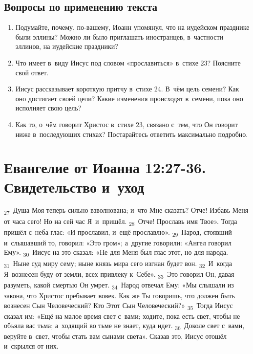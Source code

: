 \documentclass[a4paper,12pt]{article}
\begin{document}
\subsection*{Вопросы по применению текста} 
\begin{enumerate}
    \item Подумайте, почему, по-вашему, Иоанн упомянул, что на иудейском празднике были эллины? Можно ли было приглашать иностранцев, в~частности эллинов, на иудейские праздники?
    
    \myline
    
    \myline
    \item Что имеет в~виду Иисус под словом «прославиться» в~стихе 23? Поясните свой ответ. 
    
    \myline
    
    \myline
    \item Иисус рассказывает короткую притчу в~стихе 24. В~чём цель семени? Как оно достигает своей цели? Какие изменения происходят в~семени, пока оно исполняет свою цель? 
    
    \myline
    
    \myline
    \item Как то, о~чём говорит Христос в~стихе 23, связано с~тем, что Он говорит ниже в~последующих стихах? Постарайтесь ответить максимально подробно. 
    
    \myline
    
    \myline
\end{enumerate}



\section{Евангелие от Иоанна 12:27-36. Свидетельство и~уход}

\textsubscript{27}~Душа Моя теперь сильно взволнована; и~что Мне сказать? Отче! Избавь Меня от часа сего! Но на сей час Я~и~пришёл. \textsubscript{28}~Отче! Прославь имя Твое». Тогда пришёл с~неба глас: «И прославил, и~ещё прославлю». \textsubscript{29}~Народ, стоявший и~слышавший то, говорил: «Это гром»; а~другие говорили: «Ангел говорил Ему». \textsubscript{30}~Иисус на это сказал: «Не для Меня был глас этот, но для народа. \textsubscript{31}~Ныне суд миру сему; ныне князь мира сего изгнан будет вон. \textsubscript{32}~И~когда Я~вознесен буду от земли, всех привлеку к~Себе». \textsubscript{33}~Это говорил Он, давая разуметь, какой смертью Он умрет. \textsubscript{34}~Народ отвечал Ему: «Мы слышали из закона, что Христос пребывает вовек. Как же Ты говоришь, что должен быть вознесен Сын Человеческий? Кто Этот Сын Человеческий?» \textsubscript{35}~Тогда Иисус сказал им: «Ещё на малое время свет с~вами; ходите, пока есть свет, чтобы не объяла вас тьма; а~ходящий во тьме не знает, куда идет. \textsubscript{36}~Доколе свет с~вами, веруйте в~свет, чтобы стать вам сынами света». Сказав это, Иисус отошёл и~скрылся от них. 
\end{document}
